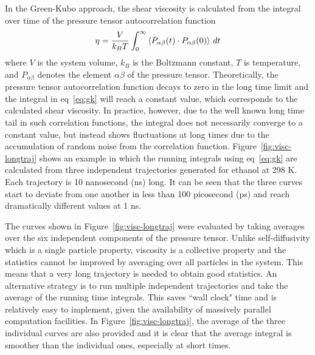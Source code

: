 \documentclass[12pt]{article}
\begin{document}
In the Green-Kubo approach,
the shear viscosity is calculated from the integral over time of the pressure tensor autocorrelation function 
\begin{equation}
{\eta = {V \over k_B T } \int_0 ^{\infty}{\langle P_{\alpha\beta}(t) \cdot P_{\alpha\beta}(0) \rangle \ dt} }
\label{eq:gk}
\end{equation}
where $V$ is the system volume,
$k_B$ is the Boltzmann constant,
$T$ is temperature, and 
$P_{\alpha\beta}$ denotes the element $\alpha\beta$ of the pressure tensor.
Theoretically,
the pressure tensor autocorrelation function decays to zero in the long time limit
and the integral in eq~\ref{eq:gk} will reach a constant value,
which corresponds to the calculated shear viscosity.
In practice, however, 
due to the well known long time tail in such correlation functions,
\cite{Verlet.PRA.7.1690.1973}
the integral does not necessarily converge to a constant value, but instead shows fluctuations at long times due to the accumulation of random noise from the correlation function. 
Figure~\ref{fig:visc-longtraj} shows an example in which the running integrals using eq~\ref{eq:gk} are calculated from three independent trajectories generated for ethanol at 298 K. 
Each trajectory is 10 nanosecond (ns) long.
It can be seen that the three curves start to deviate from one another in less than 100 picosecond (ps)
and reach dramatically different values at 1 ns.

The curves shown in Figure~\ref{fig:visc-longtraj} were evaluated by taking averages over the six independent components of the pressure tensor. \cite{Evans.JCP.100.541.1994,Hess.JCP.116.209.2002} Unlike self-diffusivity which is a single particle property,
viscosity is a collective property and 
the statistics cannot be improved by averaging over all particles in the system. This means that a very long trajectory is needed to obtain good statistics.
An alternative strategy is to run multiple independent trajectories and take the average of the running time integrals.
\cite{Gasser.JCP.136.094501.2012,
Bala.JCED.59.3061.2014}
This saves ``wall clock" time and is relatively easy to implement, given the availability of massively parallel computation facilities.
In Figure~\ref{fig:visc-longtraj},
the average of the three individual curves are also provided
and it is clear that the average integral is smoother than the individual ones, especially at short times.
\end{document}
